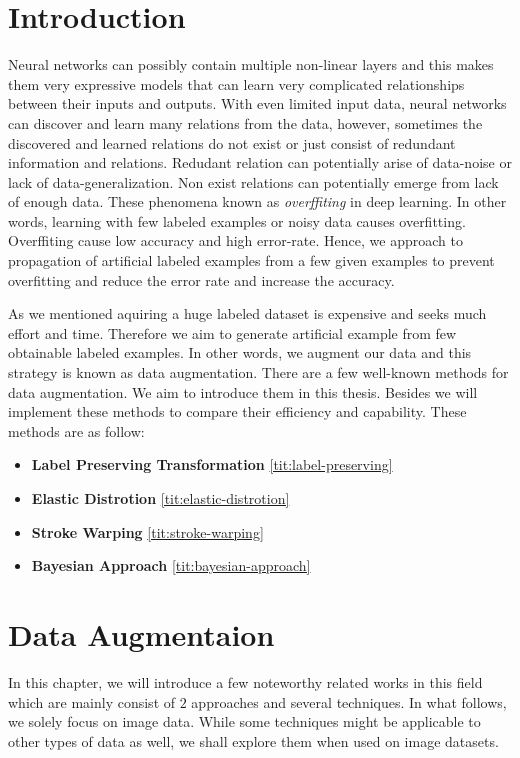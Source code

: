 \chapter{Introduction}

Neural networks can possibly contain multiple non-linear layers and this makes them very expressive models
that can learn very complicated relationships between their inputs and outputs. With even limited
input data, neural networks can discover and learn many relations from the data, however, sometimes the
discovered and learned relations do not exist or just consist of redundant information and
relations. Redudant relation can potentially arise of data-noise or lack of data-generalization. Non
exist relations can potentially emerge from lack of enough data. These phenomena known as
\textit{overffiting} in deep learning. In other words, learning with few labeled examples or noisy
data causes overfitting. Overffiting cause low accuracy and high error-rate. Hence, we approach to propagation of artificial
labeled examples from a few given examples to prevent overfitting and reduce the error rate and increase
the accuracy.

As we mentioned aquiring a huge labeled dataset is expensive and seeks much effort and time. Therefore we aim to generate artificial example from few obtainable labeled examples. In other words, we
augment our data and this strategy is known as data augmentation. There are a few well-known methods for data augmentation. We aim to introduce them in this thesis.  Besides we will implement these
methods to compare their efficiency and capability. These methods are as follow:
\begin{itemize}
  \item \textbf{Label Preserving Transformation} \ref{tit:label-preserving}
  \item \textbf{Elastic Distrotion} \ref{tit:elastic-distrotion}
  \item \textbf{Stroke Warping} \ref{tit:stroke-warping}
  \item \textbf{Bayesian Approach} \ref{tit:bayesian-approach}
\end{itemize}


\chapter{Data Augmentaion}
\label{tit:data-augmentation}
In this chapter, we will introduce a few noteworthy related works in this field which are mainly consist of $2$ approaches and several techniques.
In what follows, we solely focus on image data.  While some techniques might be applicable to other
types of data as well, we shall explore them when used on image datasets.

